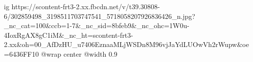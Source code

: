  
 
 
 
 

\ifcmt
  ig https://scontent-frt3-2.xx.fbcdn.net/v/t39.30808-6/302859498_3198511703747541_5718058207926836426_n.jpg?_nc_cat=100&ccb=1-7&_nc_sid=8bfeb9&_nc_ohc=1W0u-4IoxRgAX8gC1iM&_nc_ht=scontent-frt3-2.xx&oh=00_AfDzHU_u7406EznaaMLjWSDn8M96vjJaYdLUOwVh2rWupw&oe=6436FF10
  @wrap center
  @width 0.9
\fi

